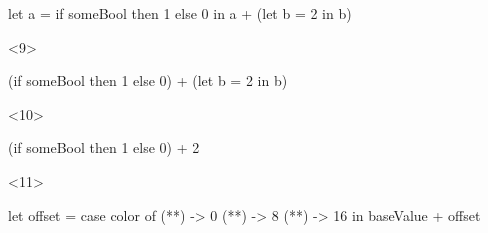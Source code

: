 \documentclass[17pt]{beamer}
\renewcommand{\(}[1]{\begin{columns}[#1]}
\renewcommand{\)}{\end{columns}}
\newcommand{\<}[1]{\begin{column}{#1}}
\renewcommand{\>}{\end{column}}
\begin{document}
\begin{frame}[fragile]
\begin{minipage}[c][.5\textheight]{\textwidth}
\begin{center}
\begin{onlyenv}
      \begin{code}
let a = if someBool then 1 else 0
in  a + (let b = 2 in b)
      \end{code}
    \end{onlyenv}
    \begin{onlyenv}<9>
      \begin{code}[eval]
(if someBool then 1 else 0) + (let b = 2 in b)
      \end{code}
    \end{onlyenv}
    \begin{onlyenv}<10>
      \begin{code}[eval]
(if someBool then 1 else 0) + 2
      \end{code}
    \end{onlyenv}
    \begin{onlyenv}<11>
      \begin{code}
let offset = case color of
                 (**)   ->  0
                 (**) ->  8
                 (**)  -> 16
in baseValue + offset
      \end{code}
    \end{onlyenv}
  \end{center}
  \end{minipage}
\end{frame}
\end{document}
